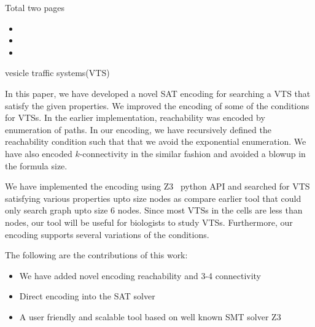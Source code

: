 Total two pages

\begin{itemize}
\item {}

\item {}

\item {}

\end{itemize}




vesicle traffic systems(VTS)





%

In this paper, we have developed a novel SAT encoding for
searching a VTS that satisfy the given properties.
%
We improved the encoding of some of the conditions for VTSs.
%
In the earlier implementation, reachability was encoded by
enumeration of paths.
%
In our encoding, we have recursively defined the reachability condition
such that that we avoid the exponential enumeration.
%
We have also encoded $k$-connectivity in the similar fashion and
avoided a blowup in the formula size.
%

We have implemented the encoding using Z3~\cite{z3} python API and searched for
VTS satisfying various properties upto size  nodes as compare
earlier tool that could only search graph upto size 6 nodes.
%
Since most VTSs in the cells are less than  nodes,
our tool will be useful for biologists to study VTSs.
%
Furthermore, our encoding supports several variations of
the conditions.


The following are the contributions of this work:
\begin{itemize}
\item We have added novel encoding reachability and 3-4 connectivity
\item Direct encoding into the SAT solver
\item A user friendly and scalable tool based on well known SMT solver Z3
\end{itemize}


